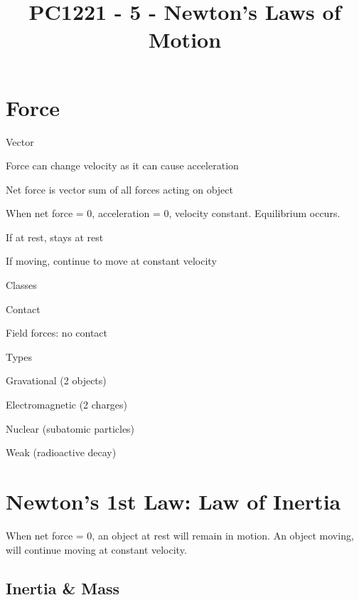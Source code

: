 \documentclass[12pt]{article}
\title{\textbf{PC1221 - 5 - Newton's Laws of Motion}}
\date{}
\begin{document}
\maketitle

\begin{spacing}{1.5}

\section{Force}

\begin{itemize*}
	\item Vector
	\item Force can change velocity as it can cause acceleration
	\item Net force is vector sum of all forces acting on object 
	\item When net force = 0, acceleration = 0, velocity constant. Equilibrium occurs.
		\begin{itemize*}
			\item If at rest, stays at rest
			\item If moving, continue to move at constant velocity
		\end{itemize*}
	\item Classes
		\begin{itemize*}
			\item Contact
			\item Field forces: no contact
		\end{itemize*}
	\item Types
		\begin{itemize*}
			\item Gravational (2 objects)
			\item Electromagnetic (2 charges)
			\item Nuclear (subatomic particles)
			\item Weak (radioactive decay)
		\end{itemize*}
\end{itemize*}

\section{Newton's 1st Law: Law of Inertia}

When net force = 0, an object at rest will remain in motion. An object moving, will continue moving at constant velocity. 

\subsection{Inertia \& Mass}


\end{spacing}
\end{document}
